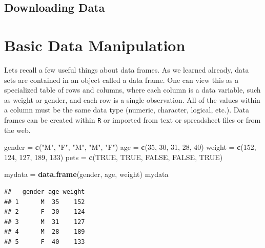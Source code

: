 \documentclass[
]{book}
\newenvironment{Shaded}{\begin{snugshade}}{\end{snugshade}}
\newcommand{\DecValTok}[1]{\textcolor[rgb]{0.00,0.00,0.81}{#1}}
\newcommand{\KeywordTok}[1]{\textcolor[rgb]{0.13,0.29,0.53}{\textbf{#1}}}
\newcommand{\NormalTok}[1]{#1}
\newcommand{\OtherTok}[1]{\textcolor[rgb]{0.56,0.35,0.01}{#1}}
\newcommand{\StringTok}[1]{\textcolor[rgb]{0.31,0.60,0.02}{#1}}
\begin{document}
\hypertarget{downloading-data}{%
\subsection*{Downloading Data}\label{downloading-data}}

\hypertarget{basic-data-manipulation}{%
\section{Basic Data Manipulation}\label{basic-data-manipulation}}

Lets recall a few useful things about data frames. As we learned already, data sets are contained in an object called a data frame. One can view this as a specialized table of rows and columns, where each column is a data variable, such as weight or gender, and each row is a single observation. All of the values within a column must be the same data type (numeric, character, logical, etc.). Data frames can be created within \texttt{R} or imported from text or spreadsheet files or from the web.

\begin{Shaded}
\begin{Highlighting}[]
\NormalTok{gender =}\StringTok{ }\KeywordTok{c}\NormalTok{(}\StringTok{"M"}\NormalTok{, }\StringTok{"F"}\NormalTok{, }\StringTok{"M"}\NormalTok{, }\StringTok{"M"}\NormalTok{, }\StringTok{"F"}\NormalTok{)}
\NormalTok{age =}\StringTok{ }\KeywordTok{c}\NormalTok{(}\DecValTok{35}\NormalTok{, }\DecValTok{30}\NormalTok{, }\DecValTok{31}\NormalTok{, }\DecValTok{28}\NormalTok{, }\DecValTok{40}\NormalTok{)}
\NormalTok{weight =}\StringTok{ }\KeywordTok{c}\NormalTok{(}\DecValTok{152}\NormalTok{, }\DecValTok{124}\NormalTok{, }\DecValTok{127}\NormalTok{, }\DecValTok{189}\NormalTok{, }\DecValTok{133}\NormalTok{)}
\NormalTok{pets =}\StringTok{ }\KeywordTok{c}\NormalTok{(}\OtherTok{TRUE}\NormalTok{, }\OtherTok{TRUE}\NormalTok{, }\OtherTok{FALSE}\NormalTok{, }\OtherTok{FALSE}\NormalTok{, }\OtherTok{TRUE}\NormalTok{)}

\NormalTok{mydata =}\StringTok{ }\KeywordTok{data.frame}\NormalTok{(gender, age, weight)}
\NormalTok{mydata}
\end{Highlighting}
\end{Shaded}

\begin{verbatim}
##   gender age weight
## 1      M  35    152
## 2      F  30    124
## 3      M  31    127
## 4      M  28    189
## 5      F  40    133
\end{verbatim}
\end{document}
